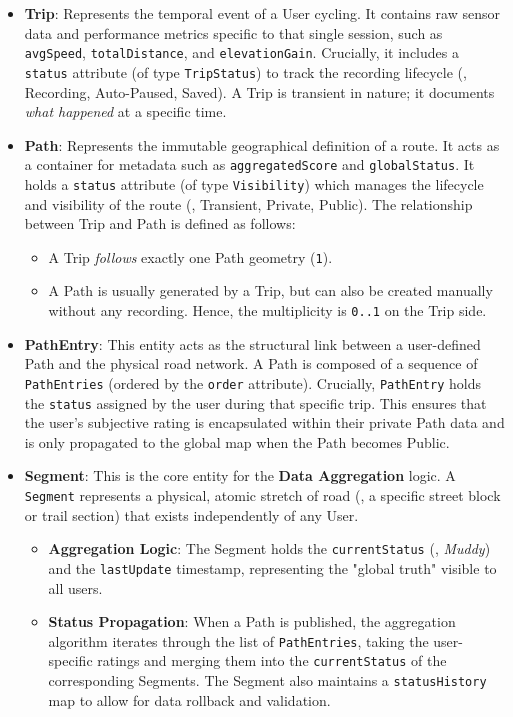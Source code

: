 \begin{itemize}
    \item \textbf{Trip}: 
    Represents the temporal event of a User cycling. It contains raw sensor data and performance metrics specific to that single session, such as \texttt{avgSpeed}, \texttt{totalDistance}, and \texttt{elevationGain}. 
    Crucially, it includes a \texttt{status} attribute (of type \texttt{TripStatus}) to track the recording lifecycle (\eg, Recording, Auto-Paused, Saved). A Trip is transient in nature; it documents \emph{what happened} at a specific time.
    
    \item \textbf{Path}: 
    Represents the immutable geographical definition of a route. It acts as a container for metadata such as \texttt{aggregatedScore} and \texttt{globalStatus}. 
    It holds a \texttt{status} attribute (of type \texttt{Visibility}) which manages the lifecycle and visibility of the route (\eg, Transient, Private, Public).
    The relationship between Trip and Path is defined as follows:
    \begin{itemize}
        \item A Trip \emph{follows} exactly one Path geometry (\texttt{1}).
        \item A Path is usually generated by a Trip, but can also be created manually without any recording. Hence, the multiplicity is \texttt{0..1} on the Trip side.
    \end{itemize}

    \item \textbf{PathEntry}: 
    This entity acts as the structural link between a user-defined Path and the physical road network. A Path is composed of a sequence of \texttt{PathEntries} (ordered by the \texttt{order} attribute).
    Crucially, \texttt{PathEntry} holds the \texttt{status} assigned by the user during that specific trip. This ensures that the user's subjective rating is encapsulated within their private Path data and is only propagated to the global map when the Path becomes Public.

    \item \textbf{Segment}: 
    This is the core entity for the \textbf{Data Aggregation} logic. A \texttt{Segment} represents a physical, atomic stretch of road (\eg, a specific street block or trail section) that exists independently of any User. 
    \begin{itemize}
        \item \textbf{Aggregation Logic}: The Segment holds the \texttt{currentStatus} (\eg, \emph{Muddy}) and the \texttt{lastUpdate} timestamp, representing the "global truth" visible to all users.
        \item \textbf{Status Propagation}: When a Path is published, the aggregation algorithm iterates through the list of \texttt{PathEntries}, taking the user-specific ratings and merging them into the \texttt{currentStatus} of the corresponding Segments. The Segment also maintains a \texttt{statusHistory} map to allow for data rollback and validation.
    \end{itemize}
\end{itemize}

